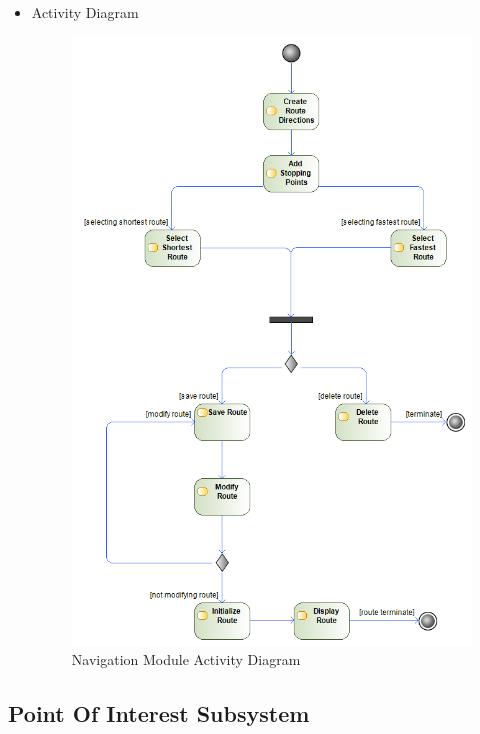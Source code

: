 \documentclass{article}
\begin{document}
\begin{itemize}
				\item Activity Diagram
 				\begin{center}
 					\begin{figure}[!h]
 						\includegraphics[scale=0.45]{navigationActivityDiagram.png}
 						\caption{Navigation Module Activity Diagram}
 					\end{figure}
 				\end{center}
				
				
			\end{itemize}
		\subsection{Point Of Interest Subsystem}
			
\end{document}
